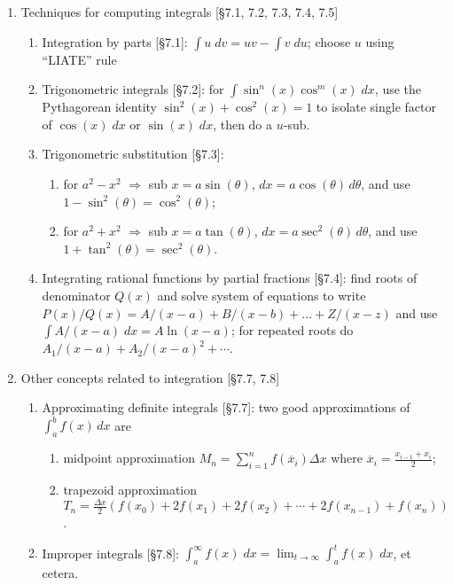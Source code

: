 \documentclass[11pt]{article}
\begin{document}
\begin{enumerate}
\item Techniques for computing integrals [\S7.1, 7.2, 7.3, 7.4, 7.5]
\begin{enumerate}
\item Integration by parts [\S7.1]: $\int u \; dv = uv - \int v \; du$; choose $u$ using ``LIATE'' rule
\item Trigonometric integrals [\S7.2]: for $\int \sin^n(x) \cos^m(x) \; dx$, use the Pythagorean identity $\sin^2(x) + \cos^2(x)=1$ to isolate single factor of $\cos(x) \; dx$ or $\sin(x) \; dx$, then do a $u$-sub.
\item Trigonometric substitution [\S7.3]: 
\begin{enumerate}
\item for $a^2-x^2$ $\Rightarrow$ sub $x = a\sin(\theta)$, $dx = a\cos(\theta) \, d\theta$, and use $1-\sin^2(\theta) = \cos^2(\theta)$;
\item for $a^2+x^2$ $\Rightarrow$ sub $x = a\tan(\theta)$, $dx = a\sec^2(\theta) \, d\theta$, and use $1+\tan^2(\theta) = \sec^2(\theta)$.
\end{enumerate}
\item Integrating rational functions by partial fractions [\S7.4]: find roots of denominator $Q(x)$ and solve system of equations to write $P(x)/Q(x) = A/(x-a) + B/(x-b) + ...  + Z/(x-z)$ and use $\int A/(x-a) \;dx = A \ln(x-a)$; for repeated roots do $A_1/(x-a) + A_2/(x-a)^2 + \cdots$.
\end{enumerate}

\item Other concepts related to integration [\S7.7, 7.8]
\begin{enumerate}
\item Approximating definite integrals [\S7.7]: two good approximations of $\int_{a}^{b} f(x) \, dx$ are
\begin{enumerate}
\item midpoint approximation $M_n = \sum_{i=1}^{n} f(\overline{x}_i) \Delta x$ where $\overline{x}_i = \frac{x_{i-1}+x_i}{2}$;
\item trapezoid approximation $T_n = \frac{\Delta x}{2} (f(x_0)+2f(x_1) + 2f(x_2) + \cdots + 2f(x_{n-1}) + f(x_n) )$.
\end{enumerate}
\item Improper integrals [\S7.8]: $\int_{a}^{\infty} f(x) \; dx = \lim_{t\to \infty} \int_a^t f(x) \; dx$, et cetera.
\end{enumerate}

\pagebreak
\thispagestyle{empty}


\end{enumerate}
\end{document}
